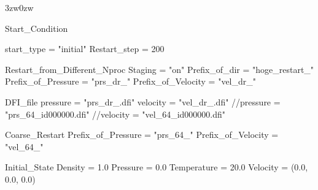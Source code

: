 \begin{indentation}{3zw}{0zw}

{\small
\begin{program}
  Start_Condition {
    start_type         = "initial"
    Restart_step       = 200

    Restart_from_Different_Nproc {
      Staging = "on"
      Prefix_of_dir = "hoge_restart_"
      Prefix_of_Pressure = "prs_dr_"
      Prefix_of_Velocity = "vel_dr_"
    }

    DFI_file {
      pressure  = "prs_dr_.dfi"
      velocity  = "vel_dr_.dfi"
      //pressure  = "prs_64_id000000.dfi"
      //velocity  = "vel_64_id000000.dfi"
    }

    Coarse_Restart {
      Prefix_of_Pressure = "prs_64_"
      Prefix_of_Velocity = "vel_64_"
    }

    Initial_State {
      Density     = 1.0
      Pressure    = 0.0
      Temperature = 20.0
      Velocity    = (0.0, 0.0, 0.0)
    }
  }
\end{program}
}



\end{indentation}
